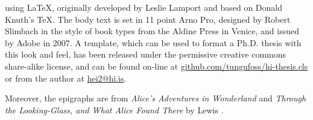  using \LaTeX, originally developed by 
Leslie Lamport and based on Donald Knuth's \TeX. The body text is set in 11 
point Arno Pro, designed by Robert Slimbach in the style of book types from the 
Aldine Press in Venice, and issued by Adobe in 2007. 
A template, which can be used to format a Ph.D. thesis with this look and feel, 
has been released under the permissive creative commons share-alike license, 
and can be found on-line at 
\href{https://github.com/tungufoss/hi-thesis.cls}{github.com/tungufoss/hi-thesis.cls}
or from the author at \href{mailto:hei2@hi.is}{hei2@hi.is}. 

Moreover, the epigraphs are from \emph{Alice's Adventures in Wonderland} 
\citeyearpar{alice} and \emph{Through the Looking-Glass, and What Alice Found 
There} \citeyearpar{lookingglass} by Lewis \citeauthor{alice}.